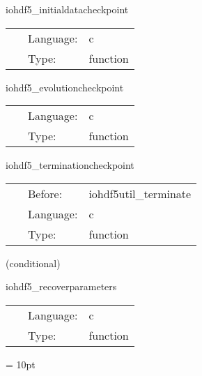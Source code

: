 \documentclass{article}
\begin{document}
\vspace{5mm}


\hspace{5mm} iohdf5\_initialdatacheckpoint 

\hspace{5mm}{\it initial data checkpoint routine } 


\hspace{5mm}

 \begin{tabular*}{160mm}{cll} 
~ & Language:  & c \\ 
~ & Type:  & function \\ 
\end{tabular*} 


\vspace{5mm}


\hspace{5mm} iohdf5\_evolutioncheckpoint 

\hspace{5mm}{\it evolution data checkpoint routine } 


\hspace{5mm}

 \begin{tabular*}{160mm}{cll} 
~ & Language:  & c \\ 
~ & Type:  & function \\ 
\end{tabular*} 


\vspace{5mm}


\hspace{5mm} iohdf5\_terminationcheckpoint 

\hspace{5mm}{\it termination checkpoint routine } 


\hspace{5mm}

 \begin{tabular*}{160mm}{cll} 
~ & Before:  & iohdf5util\_terminate \\ 
~ & Language:  & c \\ 
~ & Type:  & function \\ 
\end{tabular*} 


\vspace{5mm}

   (conditional) 

\hspace{5mm} iohdf5\_recoverparameters 

\hspace{5mm}{\it parameter recovery routine } 


\hspace{5mm}

 \begin{tabular*}{160mm}{cll} 
~ & Language:  & c \\ 
~ & Type:  & function \\ 
\end{tabular*} 



\vspace{5mm}\parskip = 10pt 
\end{document}
